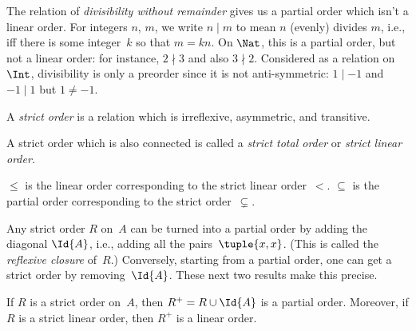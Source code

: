 \documentclass[../../../include/open-logic-section]{subfiles}
\begin{document}
\begin{ex}
The relation of \emph{divisibility without remainder} gives us a
partial order which isn't a linear order. For integers $n$, $m$, we
write $n\mid m$ to mean $n$ (evenly) divides $m$, i.e., iff there is
some integer~$k$ so that $m=kn$. On $\Nat$, this is a partial order, but not a
linear order: for instance, $2\nmid3$ and also $3\nmid2$. Considered
as a relation on $\Int$, divisibility is only a preorder since
it is not anti-symmetric: $1\mid-1$ and $-1\mid1$ but $1\neq-1$.
\end{ex}

\begin{defn}
A \emph{strict order} is a relation which is irreflexive, asymmetric,
and transitive.
\end{defn}

\begin{defn}
A strict order which is also connected is called a 
\emph{strict total order} or \emph{strict linear order.}
\end{defn}

\begin{ex}
$\le$ is the linear order corresponding to the strict linear
order~$<$. $\subseteq$ is the partial order corresponding to the
strict order~$\subsetneq$.
\end{ex}

Any strict order $R$ on~$A$ can be turned into a partial order by
adding the diagonal $\Id{A}$, i.e., adding all the pairs~$\tuple{x,
x}$.  (This is called the \emph{reflexive closure} of~$R$.)
Conversely, starting from a partial order, one can get a strict order
by removing~$\Id{A}$. These next two results make this precise.

\begin{prop}
If $R$ is a strict order on~$A$, then $R^+ = R \cup \Id{A}$ is a
partial order. Moreover, if $R$ is a strict linear order, then $R^+$ is 
a linear order.
\end{prop}
\end{document}
